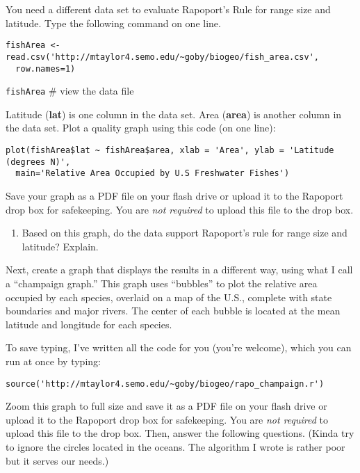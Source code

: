 \documentclass[11pt]{article}
\begin{document}
You need a different data set to evaluate Rapoport's Rule for range size and latitude. 
Type the following command on one line.

\begin{verbatim}
fishArea <- read.csv('http://mtaylor4.semo.edu/~goby/biogeo/fish_area.csv',
  row.names=1)
\end{verbatim}

\texttt{fishArea} \qquad \# view the data file

Latitude (\textbf{lat}) is one column in the data set. Area
(\textbf{area}) is another column in the data set. Plot a quality
graph using this code (on one line):

\begin{verbatim}
plot(fishArea$lat ~ fishArea$area, xlab = 'Area', ylab = 'Latitude (degrees N)',
  main='Relative Area Occupied by U.S Freshwater Fishes')
\end{verbatim}

Save your graph as a PDF file on your flash drive or upload it to the
Rapoport drop box for safekeeping. You are \emph{not required} to upload
this file to the drop box.

\begin{enumerate}[resume]
	\item Based on this graph, do the data support Rapoport's rule for
range size and latitude? Explain.

\vspace{7\baselineskip}
\end{enumerate}

Next, create a graph that displays the results in a different way, using what
I call a “champaign graph.” This graph uses ``bubbles'' to plot the
relative area occupied by each species, overlaid on a map of the U.S.,
complete with state boundaries and major rivers.  The center of each bubble
is located at the mean latitude and longitude for each species.

To save typing, I've written all the code for you (you're welcome), which you can run at once by typing:

\begin{verbatim}
source('http://mtaylor4.semo.edu/~goby/biogeo/rapo_champaign.r')
\end{verbatim}

Zoom this graph to full size and save it as a PDF file on your flash
drive or upload it to the Rapoport drop box for safekeeping. You are
\emph{not required} to upload this file to the drop box. Then, answer
the following questions. (Kinda try to ignore the circles located in the
oceans. The algorithm I wrote is rather poor but it serves our needs.)
\end{document}
